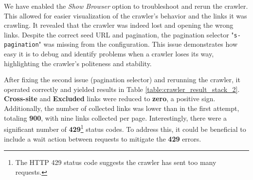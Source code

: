 {We have enabled the \textit{Show Browser} option to troubleshoot and rerun the crawler. This allowed for easier visualization of the crawler's behavior and the links it was crawling. It revealed that the crawler was indeed lost and opening the wrong links. Despite the correct seed URL and pagination, the pagination selector "\texttt{s-pagination}" was missing from the configuration. This issue demonstrates how easy it is to debug and identify problems when a crawler loses its way, highlighting the crawler's politeness and stability.


After fixing the second issue (pagination selector) and rerunning the crawler, it operated correctly and yielded results in Table \ref{table:crawler_result_stack_2}. \textbf{Cross-site} and \textbf{Excluded} links were reduced to \textbf{zero}, a positive sign. Additionally, the number of collected links was lower than in the first attempt, totaling \textbf{900}, with nine links collected per page. Interestingly, there were a significant number of \textbf{429}\footnote{The HTTP 429 status code suggests the crawler has sent too many requests.} status codes. To address this, it could be beneficial to include a wait action between requests to mitigate the \textbf{429} errors.


}
